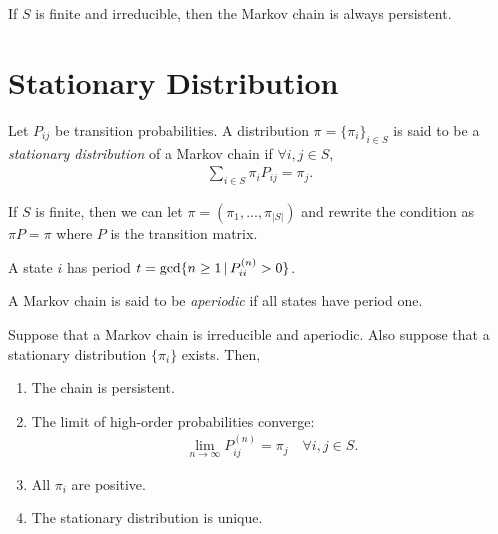 \documentclass[a4paper,12pt]{article}
\begin{document}
\begin{corollary}
	If $S$ is finite and irreducible, then the Markov chain is always persistent.
\end{corollary}

\section{Stationary Distribution}

\begin{definition}
	Let $P_{ij}$ be transition probabilities.
	A distribution $\pi=\{\pi_{i}\}_{i\in S}$ is said to be a \emph{stationary distribution} of a Markov chain
	if $\forall i,j\in S$,
	\begin{align*}
		\sum_{i\in S} \pi_{i}P_{ij} = \pi_{j}.
	\end{align*}
\end{definition}

\begin{remark}
	If $S$ is finite,
	then we can let $\pi=(\pi_{1},...,\pi_{|S|})$ and rewrite the condition as
	$\pi P=\pi$ where $P$ is the transition matrix.
\end{remark}

\begin{definition}[Period]
	A state $i$ has period $t=\gcd\{n\geq1\,|\, P_{ii}^{(n)}>0\}$.
\end{definition}

\begin{definition}[Aperiodic]
	A Markov chain is said to be \emph{aperiodic} if all states have period one.
\end{definition}

\begin{definition}
	Suppose that a Markov chain is irreducible and aperiodic.
	Also suppose that a stationary distribution $\{\pi_{i}\}$ exists.
	Then,
	\begin{enumerate}[label=(\roman*)]
		\item
			The chain is persistent.
		\item
			The limit of high-order probabilities converge:
			\begin{align*}
				\lim_{n\to\infty} P^{(n)}_{ij} = \pi_{j} \quad\forall i,j\in S.
			\end{align*}
		\item
			All $\pi_{i}$ are positive.
		\item
			The stationary distribution is unique.
	\end{enumerate}
\end{definition}
\end{document}
